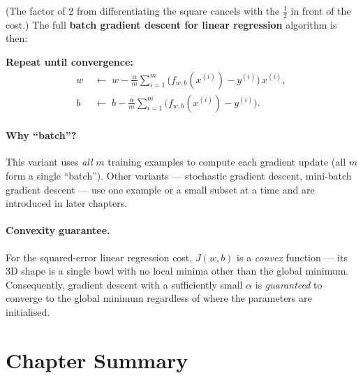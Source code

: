 (The factor of 2 from differentiating the square cancels with the $\tfrac{1}{2}$
in front of the cost.) The full \textbf{batch gradient descent for linear
regression} algorithm is then:

\medskip
\textbf{Repeat until convergence:}
\begin{align*}
w &\;\leftarrow\; w - \frac{\alpha}{m}\sum_{i=1}^{m}
  \bigl(f_{w,b}(x^{(i)})-y^{(i)}\bigr)\,x^{(i)},\\[4pt]
b &\;\leftarrow\; b - \frac{\alpha}{m}\sum_{i=1}^{m}
  \bigl(f_{w,b}(x^{(i)})-y^{(i)}\bigr).
\end{align*}

\paragraph{Why ``batch''?}
This variant uses \emph{all} $m$ training examples to compute each gradient
update (all $m$ form a single ``batch''). Other variants --- stochastic gradient
descent, mini-batch gradient descent --- use one example or a small subset at
a time and are introduced in later chapters.

\paragraph{Convexity guarantee.}
For the squared-error linear regression cost, $J(w,b)$ is a \emph{convex}
function --- its 3D shape is a single bowl with no local minima other than the
global minimum. Consequently, gradient descent with a sufficiently small
$\alpha$ is \emph{guaranteed} to converge to the global minimum regardless of
where the parameters are initialised.

\section*{Chapter Summary}

